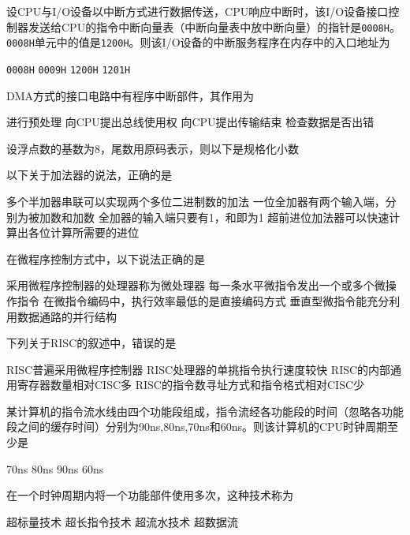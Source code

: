 \documentclass[a4paper]{exam}
\newif\ifprint
\newcommand{\blank}[2][1cm]{\uline{\makebox[#1][c]{%
			\ifprint
			\phantom{#2}%
			\else
			#2%
			\fi}}}
\begin{document}
\begin{questions}
	\question 设CPU与I/O设备以中断方式进行数据传送，CPU响应中断时，该I/O设备接口控制器发送给CPU的指令中断向量表（中断向量表中放中断向量）的指针是\verb|0008H|。\verb|0008H|单元中的值是\verb|1200H|。则该I/O设备的中断服务程序在内存中的入口地址为\blank{}
	\begin{choices}
		\choice \verb|0008H|
		\choice \verb|0009H|
		\choice \verb|1200H|
        \choice \verb|1201H|
	\end{choices}
    
    \question DMA方式的接口电路中有程序中断部件，其作用为\blank{}
    \begin{choices}
    	\choice 进行预处理
    	\choice 向CPU提出总线使用权
    	\choice 向CPU提出传输结束
        \choice 检查数据是否出错
    \end{choices}

    \question 设浮点数的基数为8，尾数用原码表示，则以下\blank{}是规格化小数
    \begin{choices}
    \end{choices}

    \question 以下关于加法器的说法，正确的是\blank{}
    \begin{choices}
    	\choice 多个半加器串联可以实现两个多位二进制数的加法
    	\choice 一位全加器有两个输入端，分别为被加数和加数
    	\choice 全加器的输入端只要有1，和即为1
    	\choice 超前进位加法器可以快速计算出各位计算所需要的进位
    \end{choices}

    \question 在微程序控制方式中，以下说法正确的是\blank{}
    \begin{choices}
    	\choice 采用微程序控制器的处理器称为微处理器
    	\choice 每一条水平微指令发出一个或多个微操作指令
    	\choice 在微指令编码中，执行效率最低的是直接编码方式
    	\choice 垂直型微指令能充分利用数据通路的并行结构
    \end{choices}

    \question 下列关于RISC的叙述中，错误的是\blank{}
    \begin{choices}
    	\choice RISC普遍采用微程序控制器
    	\choice RISC处理器的单挑指令执行速度较快
    	\choice RISC的内部通用寄存器数量相对CISC多
    	\choice RISC的指令数寻址方式和指令格式相对CISC少
    \end{choices}

    \question 某计算机的指令流水线由四个功能段组成，指令流经各功能段的时间（忽略各功能段之间的缓存时间）分别为90ns,80ns,70ns和60ns。则该计算机的CPU时钟周期至少是\blank{}
    \begin{choices}
    	\choice 70ns
    	\choice 80ns
    	\choice 90ns
    	\choice 60ns
    \end{choices}

    \question 在一个时钟周期内将一个功能部件使用多次，这种技术称为\blank{}
    \begin{choices}
    	\choice 超标量技术
    	\choice 超长指令技术
    	\choice 超流水技术
    	\choice 超数据流
    \end{choices}
\end{questions}
\end{document}
